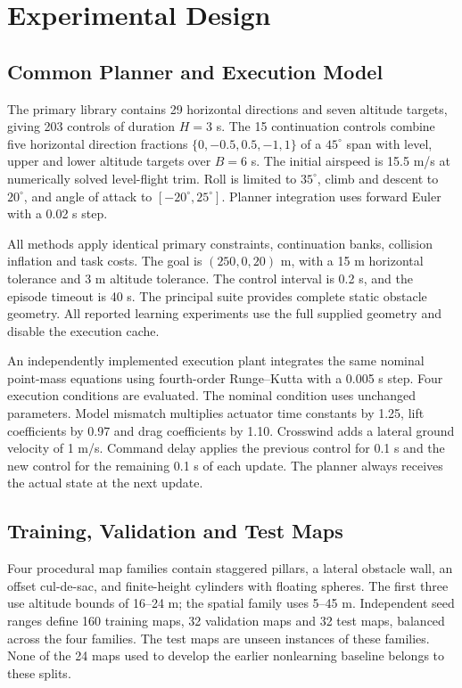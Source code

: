 \section{Experimental Design}
\subsection{Common Planner and Execution Model}
The primary library contains 29 horizontal directions and seven altitude targets, giving 203 controls of duration $H=3$ s. The 15 continuation controls combine five horizontal direction fractions $\{0,-0.5,0.5,-1,1\}$ of a $45^\circ$ span with level, upper and lower altitude targets over $B=6$ s. The initial airspeed is 15.5 m/s at numerically solved level-flight trim. Roll is limited to $35^\circ$, climb and descent to $20^\circ$, and angle of attack to $[-20^\circ,25^\circ]$. Planner integration uses forward Euler with a 0.02 s step.

All methods apply identical primary constraints, continuation banks, collision inflation and task costs. The goal is $(250,0,20)$ m, with a 15 m horizontal tolerance and 3 m altitude tolerance. The control interval is 0.2 s, and the episode timeout is 40 s. The principal suite provides complete static obstacle geometry. All reported learning experiments use the full supplied geometry and disable the execution cache.

An independently implemented execution plant integrates the same nominal point-mass equations using fourth-order Runge--Kutta with a 0.005 s step. Four execution conditions are evaluated. The nominal condition uses unchanged parameters. Model mismatch multiplies actuator time constants by 1.25, lift coefficients by 0.97 and drag coefficients by 1.10. Crosswind adds a lateral ground velocity of 1 m/s. Command delay applies the previous control for 0.1 s and the new control for the remaining 0.1 s of each update. The planner always receives the actual state at the next update.

\subsection{Training, Validation and Test Maps}
Four procedural map families contain staggered pillars, a lateral obstacle wall, an offset cul-de-sac, and finite-height cylinders with floating spheres. The first three use altitude bounds of 16--24 m; the spatial family uses 5--45 m. Independent seed ranges define 160 training maps, 32 validation maps and 32 test maps, balanced across the four families. The test maps are unseen instances of these families. None of the 24 maps used to develop the earlier nonlearning baseline belongs to these splits.

